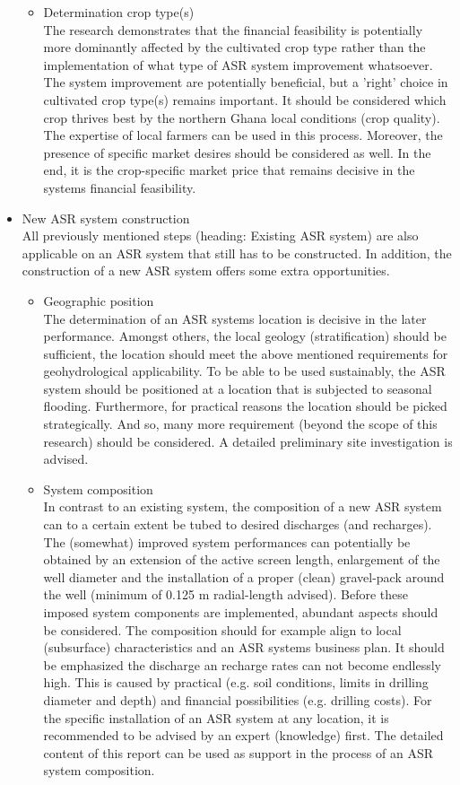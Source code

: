\begin{itemize}
\begin{itemize}
\item{Determination crop type(s)} \\
The research demonstrates that the financial feasibility is potentially more dominantly affected by the cultivated crop type rather than the implementation of what type of ASR system improvement whatsoever. The system improvement are potentially beneficial, but a 'right' choice in cultivated crop type(s) remains important. It should be considered which crop thrives best by the northern Ghana local conditions (crop quality). The expertise of local farmers can be used in this process. Moreover, the presence of specific market desires should be considered as well. In the end, it is the crop-specific market price that remains decisive in the systems financial feasibility.  
\end{itemize}

\item{New ASR system construction} \\
All previously mentioned steps (heading: Existing ASR system) are also applicable on an ASR system that still has to be constructed. In addition, the construction of a new ASR system offers some extra opportunities. 

\begin{itemize}
\item{Geographic position} \\
The determination of an ASR systems location is decisive in the later performance. Amongst others, the local geology (stratification) should be sufficient, the location should meet the above mentioned requirements for geohydrological applicability. To be able to be used sustainably, the ASR system should be positioned at a location that is subjected to seasonal flooding. Furthermore, for practical reasons the location should be picked strategically. And so, many more requirement (beyond the scope of this research) should be considered. A detailed preliminary site investigation is advised.
\item{System composition} \\
In contrast to an existing system, the composition of a new ASR system can to a certain extent be tubed to desired discharges (and recharges). The (somewhat) improved system performances can potentially be obtained by an extension of the active screen length, enlargement of the well diameter and the installation of a proper (clean) gravel-pack around the well (minimum of 0.125 m radial-length advised). Before these imposed system components are implemented, abundant aspects should be considered. The composition should for example align to local (subsurface) characteristics and an ASR systems business plan. It should be emphasized the discharge an recharge rates can not become endlessly high. This is caused by practical (e.g. soil conditions, limits in drilling diameter and depth) and financial possibilities (e.g. drilling costs). For the specific installation of an ASR system at any location, it is recommended to be advised by an expert (knowledge) first. The detailed content of this report can be used as support in the process of an ASR system composition. \\


\end{itemize}
\end{itemize}
